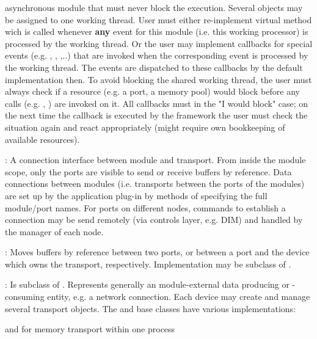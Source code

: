 \begin{compactdesc}
   asynchronous module that must never block the execution. Several 
    objects may be assigned to one working thread. User must 
   either re-implement virtual method  wich is called 
   whenever {\bf any} event for this module (i.e. this working processor) 
   is processed by the working thread. Or the user may implement 
   callbacks for special events (e.g. , 
   , ,..) that are invoked when 
   the corresponding event is processed by the working thread. 
   The events are dispatched to these callbacks by the  
   default implementation then. To avoid blocking the shared working thread, 
   the user must always check if a resource (e.g. a port, a memory pool) 
   would block before any calls (e.g. , ) are invoked on it. 
   All callbacks must  in the "I would block" case; on the next 
   time the callback is executed by the framework the user must check the situation 
   again and react appropriately (might require own bookkeeping of available resources). 
\item[\class{dabc::Port}] : A connection interface between module and transport. 
   From inside the module scope, only the ports are visible to send or  receive 
   buffers by reference. Data connections between modules 
   (i.e. transports between the ports of the modules) are set up by 
   the application plug-in by methods of  specifying the full 
   module/port names. For ports on different nodes, commands to establish 
   a connection may be send remotely (via controls layer, e.g. DIM) and 
   handled by the manager of each node.  
\item[\class{dabc::Transport}] : Moves buffers by reference between two 
   ports, or between a port and the device which owns the 
   transport, respectively. Implementation may be subclass of .
\item[\class{dabc::Device}] : Is subclass of . Represents 
   generally an module-external data producing or -consuming entity, e.g. a 
   network connection. 
   Each device may create and manage several transport objects. 
   The  and  base classes have various implementations:
\begin{compactitem}[$\bullet$]
\item {} and  for memory transport within one process

\end{compactitem}
\end{compactdesc}
